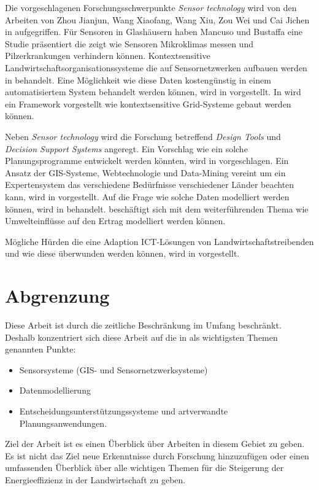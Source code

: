 Die vorgeschlagenen Forschungsschwerpunkte \textit{Sensor technology} wird von den Arbeiten von Zhou Jianjun, Wang Xiaofang, Wang Xiu, Zou Wei und Cai Jichen in \cite{proc:Zhou2013} aufgegriffen. Für Sensoren in Glashäusern haben Mancuso und Bustaffa eine Studie\cite{misc:Mancuso2006} präsentiert die zeigt wie Sensoren Mikroklimas messen und Pilzerkrankungen verhindern können. Kontextsensitive Landwirtschaftsorganisationssysteme die auf Sensornetzwerken aufbauen werden in \cite{proc:Khaydarov2012} behandelt. Eine Möglichkeit wie diese Daten kostengünstig in einem automatisiertem System behandelt werden können, wird in \cite{jour:Kamalesh2014} vorgestellt. In \cite{jour:Shaikh2010} wird ein Framework vorgestellt wie 	kontextsensitive Grid-Systeme gebaut werden können.

Neben \textit{Sensor technology} wird die Forschung betreffend \textit{Design Tools} und \textit{Decision Support Systems} angeregt. Ein Vorschlag wie ein solche Planungsprogramme entwickelt werden könnten, wird in \cite{art:Wang2011} vorgeschlagen. Ein Ansatz der GIS-Systeme, Webtechnologie und Data-Mining vereint um ein Expertensystem das verschiedene Bedürfnisse verschiedener Länder beachten kann, wird in \cite{jour:Zhu2009} vorgestellt. Auf die Frage wie solche Daten modelliert werden können, wird in \cite{jour:Schulze2007} behandelt. \cite{jour:Aqeel-ur-Rehman2011} beschäftigt sich mit dem weiterführenden Thema wie Umwelteinflüsse auf den Ertrag modelliert werden können.

Mögliche Hürden die eine Adaption ICT-Lösungen von Landwirtschaftstreibenden und wie diese überwunden werden können, wird in \cite{jour:Aubert2012} vorgestellt.

\section{Abgrenzung}
Diese Arbeit ist durch die zeitliche Beschränkung im Umfang beschränkt. Deshalb konzentriert sich diese Arbeit auf die in \cite{misc:Mikkola2013} als wichtigsten Themen genannten Punkte:

\begin{itemize}
	\item Sensorsysteme (GIS- und Sensornetzwerksysteme)
	\item Datenmodellierung
	\item Entscheidungsunterstützungssysteme und artverwandte Planungsanwendungen.
\end{itemize}

Ziel der Arbeit ist es einen Überblick über Arbeiten in diesem Gebiet zu geben. Es ist nicht das Ziel neue Erkenntnisse durch Forschung hinzuzufügen oder einen umfassenden Überblick über alle wichtigen Themen für die Steigerung der Energieeffizienz in der Landwirtschaft zu geben.

